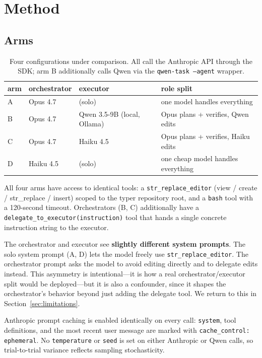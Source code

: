 \documentclass[11pt,a4paper]{article}
\begin{document}
\section{Method}

\subsection{Arms}

\begin{table}[H]
\centering
\begin{tabularx}{\textwidth}{l l l X}
\toprule
\textbf{arm} & \textbf{orchestrator} & \textbf{executor} & \textbf{role split} \\
\midrule
A & Opus 4.7 & (solo) & one model handles everything \\
B & Opus 4.7 & Qwen 3.5-9B (local, Ollama) & Opus plans + verifies, Qwen edits \\
C & Opus 4.7 & Haiku 4.5 & Opus plans + verifies, Haiku edits \\
D & Haiku 4.5 & (solo) & one cheap model handles everything \\
\bottomrule
\end{tabularx}
\caption{Four configurations under comparison. All call the Anthropic API through the SDK; arm B additionally calls Qwen via the \texttt{qwen-task --agent} wrapper.}
\end{table}

All four arms have access to identical tools: a \texttt{str\_replace\_editor} (view / create / str\_replace / insert) scoped to the typer repository root, and a \texttt{bash} tool with a 120-second timeout. Orchestrators (B, C) additionally have a \texttt{delegate\_to\_executor(instruction)} tool that hands a single concrete instruction string to the executor.

The orchestrator and executor see \textbf{slightly different system prompts}. The solo system prompt (A, D) lets the model freely use \texttt{str\_replace\_editor}. The orchestrator prompt asks the model to avoid editing directly and to delegate edits instead. This asymmetry is intentional---it is how a real orchestrator/executor split would be deployed---but it is also a confounder, since it shapes the orchestrator's behavior beyond just adding the delegate tool. We return to this in Section~\ref{sec:limitations}.

Anthropic prompt caching is enabled identically on every call: \texttt{system}, tool definitions, and the most recent user message are marked with \texttt{cache\_control: ephemeral}. No \texttt{temperature} or \texttt{seed} is set on either Anthropic or Qwen calls, so trial-to-trial variance reflects sampling stochasticity.
\end{document}

